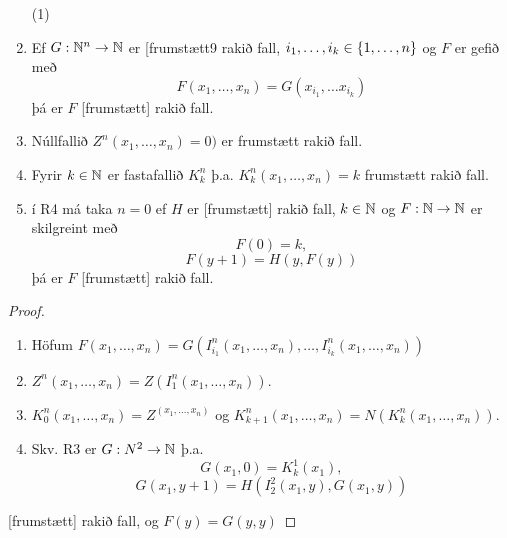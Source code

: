 \documentclass[12pt]{book}
\newcommand{\xxn}{x_1, \dotsc, x_n}
\begin{document}
\begin{setn}
  \begin{enumerate}(1)
  \item Ef $G: \mathbb{N}^n \to \mathbb{N}$ er [frumstætt9 rakið fall,
    $i_1, \dotsc, i_k \in \{1, \dotsc, n\}$ og $F$ er gefið með
    \[ F(x_1, \dotsc,x_n) = G(x_{i_1}, \dotsc x_{i_k})\]
    þá er $F$ [frumstætt] rakið fall.
  \item Núllfallið $Z^n(x_1,\dotsc,x_n) = 0)$ er frumstætt rakið fall.
  \item Fyrir $k \in \mathbb{N}$ er fastafallið $K^n_k$ þ.a.
    $K^n_k ( \xxn) = k$ frumstætt rakið fall.
  \item í R4 má taka $n=0$ ef $H$ er [frumstætt] rakið fall,
    $k \in \mathbb{N}$ og $F: \mathbb{N} \to \mathbb{N}$ er skilgreint með
    \[ F(0) = k,\]
    \[ F(y+1) = H(y,F(y)) \]
    þá er $F$ [frumstætt] rakið fall.
  \end{enumerate}
\end{setn}


\begin{proof}
  \begin{enumerate}[(1)]
  \item Höfum $F(\xxn) = G(I^n_{i_1} (\xxn), \dotsc, I^n_{i_k}(\xxn))$
  \item $Z^n(\xxn) = Z(I^n_1 ( \xxn ))$.
  \item $K^n_0 (\xxn) = Z^(\xxn)$ og
    $K^n_{k+1} (\xxn) = N(K^n_k (\xxn))$.
  \item Skv. R3 er $G: N^2 \to \mathbb{N}$ þ.a.
    \[ G(x_1, 0) = K^1_k (x_1), \]
    \[ G(x_1, y +1) = H(I^2_2 (x_1, y), G(x_1,y))\]
  \end{enumerate}
  [frumstætt] rakið fall, og $F(y) = G(y,y)$
\end{proof}
\end{document}
